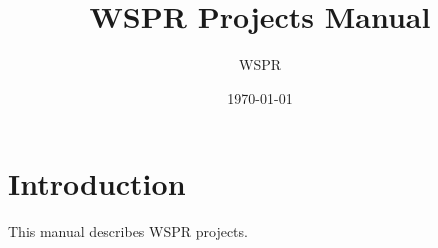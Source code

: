 \documentclass[11pt,a4paper]{article}
\title{WSPR Projects Manual}
\author{WSPR}
\date{\today}
\begin{document}
\maketitle
\tableofcontents

\section{Introduction}

This manual describes WSPR projects.
\end{document}
